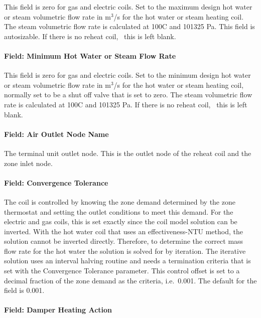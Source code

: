 This field is zero for gas and electric coils. Set to the maximum design hot water or steam volumetric flow rate in m\(^{3}\)/s for the hot water or steam heating coil. The steam volumetric flow rate is calculated at 100C and 101325 Pa. This field is autosizable. If there is no reheat coil,~ this is left blank.

\paragraph{Field: Minimum Hot Water or Steam Flow Rate}\label{field-minimum-hot-water-or-steam-flow-rate-1}

This field is zero for gas and electric coils. Set to the minimum design hot water or steam volumetric flow rate in m\(^{3}\)/s for the hot water or steam heating coil, normally set to be a shut off valve that is set to zero. The steam volumetric flow rate is calculated at 100C and 101325 Pa. If there is no reheat coil,~ this is left blank.

\paragraph{Field: Air Outlet Node Name}\label{field-air-outlet-node-name-1}

The terminal unit outlet node. This is the outlet node of the reheat coil and the zone inlet node.

\paragraph{Field: Convergence Tolerance}\label{field-convergence-tolerance-1}

The coil is controlled by knowing the zone demand determined by the zone thermostat and setting the outlet conditions to meet this demand. For the electric and gas coils, this is set exactly since the coil model solution can be inverted. With the hot water coil that uses an effectiveness-NTU method, the solution cannot be inverted directly. Therefore, to determine the correct mass flow rate for the hot water the solution is solved for by iteration. The iterative solution uses an interval halving routine and needs a termination criteria that is set with the Convergence Tolerance parameter. This control offset is set to a decimal fraction of the zone demand as the criteria, i.e.~0.001. The default for the field is 0.001.

\paragraph{Field: Damper Heating Action}\label{field-damper-heating-action}

